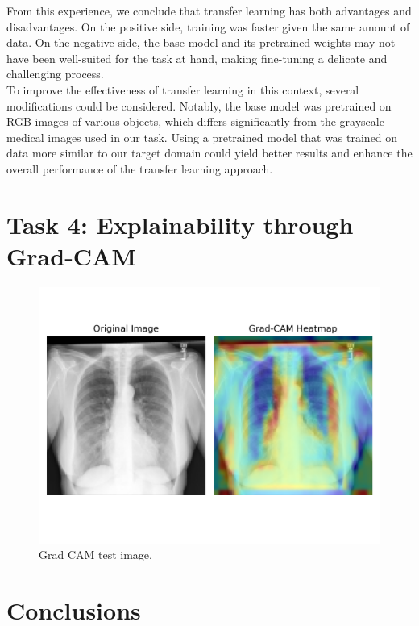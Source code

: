 \documentclass[conference]{IEEEtran}
\begin{document}
From this experience, we conclude that transfer learning has both advantages and disadvantages. On the positive side, training was faster given the same amount of data. On the negative side, the base model and its pretrained weights may not have been well-suited for the task at hand, making fine-tuning a delicate and challenging process.\\

To improve the effectiveness of transfer learning in this context, several modifications could be considered. Notably, the base model was pretrained on RGB images of various objects, which differs significantly from the grayscale medical images used in our task. Using a pretrained model that was trained on data more similar to our target domain could yield better results and enhance the overall performance of the transfer learning approach.\\






\section{Task 4: Explainability through Grad-CAM} \label{sec:task_4}

\begin{figure}[htbp]
	\centerline{\includegraphics[width=\linewidth]{Images/gradcam.png}}
	\caption{Grad CAM test image.}
	\label{fig:gradcam}
\end{figure}

\section{Conclusions}\label{sec:conclusions}
\end{document}

